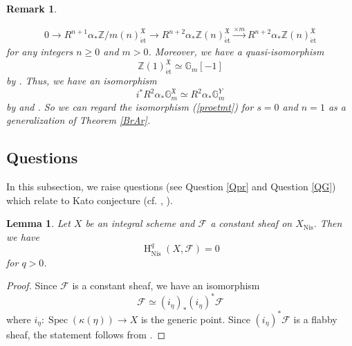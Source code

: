 \documentclass{article}
\newtheorem{lem}[thm]{\indent \sc Lemma}
\newtheorem{rem}[thm]{\indent \sc Remark}
\newcommand{\spec}{\operatorname{Spec}}
\newcommand{\et}{\mathrm{\acute{e}t}}
\newcommand{\Nis}{\mathrm{Nis}}
\newcommand{\HO}{\operatorname{H}}
\begin{document}
\begin{rem}
\begin{enumerate}
\begin{align*}
0\to 
R^{n+1}\alpha_{*}\mathbb{Z}/m(n)^{\mathfrak{X}}_{\et}
\to
R^{n+2}\alpha_{*}\mathbb{Z}(n)^{\mathfrak{X}}_{\et}
\xrightarrow{\times m}
R^{n+2}\alpha_{*}\mathbb{Z}(n)^{\mathfrak{X}}_{\et}
\end{align*}
%
for any integers $n\geq 0$ and $m>0$.
Moreover, we have a quasi-isomorphism
%
\begin{equation*}
\mathbb{Z}(1)_{\et}^{\mathfrak{X}}
\simeq
\mathbb{G}_{m}[-1]
\end{equation*}
%
by \cite[Lemma 11.2]{L}. 
Thus, we have an isomorphism
%
\begin{equation*}
i^{*}R^{2}\alpha_{*}\mathbb{G}_{m}^{\mathfrak{X}}
\simeq
R^{2}\alpha_{*}\mathbb{G}_{m}^{Y}
\end{equation*}
%
by
\cite[p.776, Proposition 2.2.b)]{Ge} and
\cite[p.148, IV, Corollary 2.13]{M}.
So we can regard the isomorphism (\ref{proetmt}) for $s=0$ and $n=1$
as a generalization of Theorem \ref{BrAr}.
\end{enumerate}
%
\end{rem}
%

%
\subsection{Questions}
%

In this subsection, we raise questions (see Question \ref{Qpr} and Question \ref{QG})
which relate to Kato conjecture (cf. \cite{K}, \cite{K-S}).



%
\begin{lem}\upshape\label{vnc}
Let $X$ be an integral scheme and $\mathcal{F}$ 
a constant sheaf on $X_{\Nis}$.
Then we have
%
\begin{equation*}
\HO^{q}_{\Nis}(
X, \mathcal{F}
) 
=0
\end{equation*}
%
for $q>0$.
\end{lem}
%

%
\begin{proof}\upshape
Since $\mathcal{F}$ is a constant sheaf, we have an isomorphism
%
\begin{equation*}
\mathcal{F}
\simeq
(i_{\eta})_{*}(i_{\eta})^{*}\mathcal{F}
\end{equation*}
%
where $i_{\eta}: \spec(\kappa(\eta))\to X$
is the generic point. Since 
$(i_{\eta})^{*}\mathcal{F}$ is a flabby sheaf, 
the statement follows from
\cite[p.89, III, Lemma 1.19]{M}.    
\end{proof}
%
\end{document}
